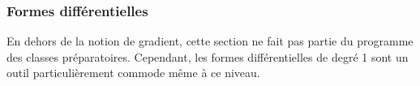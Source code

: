 
\subsubsection{Formes différentielles}

\begin{example}[Remarque]
En dehors de la notion de gradient, cette section ne
fait pas partie du programme des classes préparatoires. Cependant, les
formes différentielles de degré 1 sont un outil particulièrement commode
même à ce niveau.

  
\end{example}







